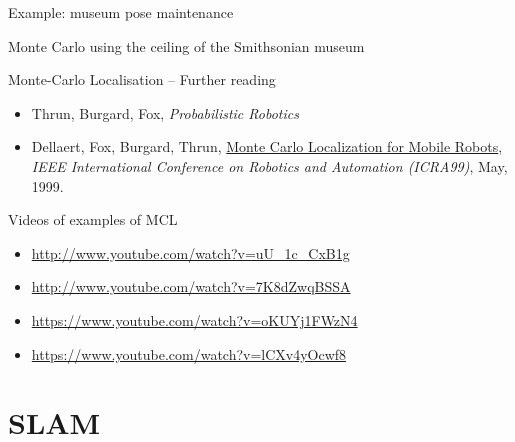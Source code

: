 \documentclass[compress]{beamer}
\begin{document}
\begin{frame}{Example: museum pose maintenance}

Monte Carlo using the ceiling of the Smithsonian museum

    \begin{center}
    \end{center}

\end{frame}

\begin{frame}{Monte-Carlo Localisation -- Further reading}

    \begin{itemize}
        \item Thrun, Burgard, Fox, \emph{Probabilistic Robotics}
        \item Dellaert, Fox, Burgard, Thrun,
            \href{http://www.ri.cmu.edu/publication_view.html?pub_id=533}{Monte
            Carlo Localization for Mobile Robots}, \emph{IEEE International
            Conference on Robotics and Automation (ICRA99)}, May, 1999.

    \end{itemize}

    Videos of examples of MCL

    \begin{itemize}
        \item \url{http://www.youtube.com/watch?v=uU_1c_CxB1g}
        \item \url{http://www.youtube.com/watch?v=7K8dZwqBSSA}
        \item \url{https://www.youtube.com/watch?v=oKUYj1FWzN4}
        \item \url{https://www.youtube.com/watch?v=lCXv4yOcwf8}
    \end{itemize}

\end{frame}

\section{SLAM}
\end{document}
